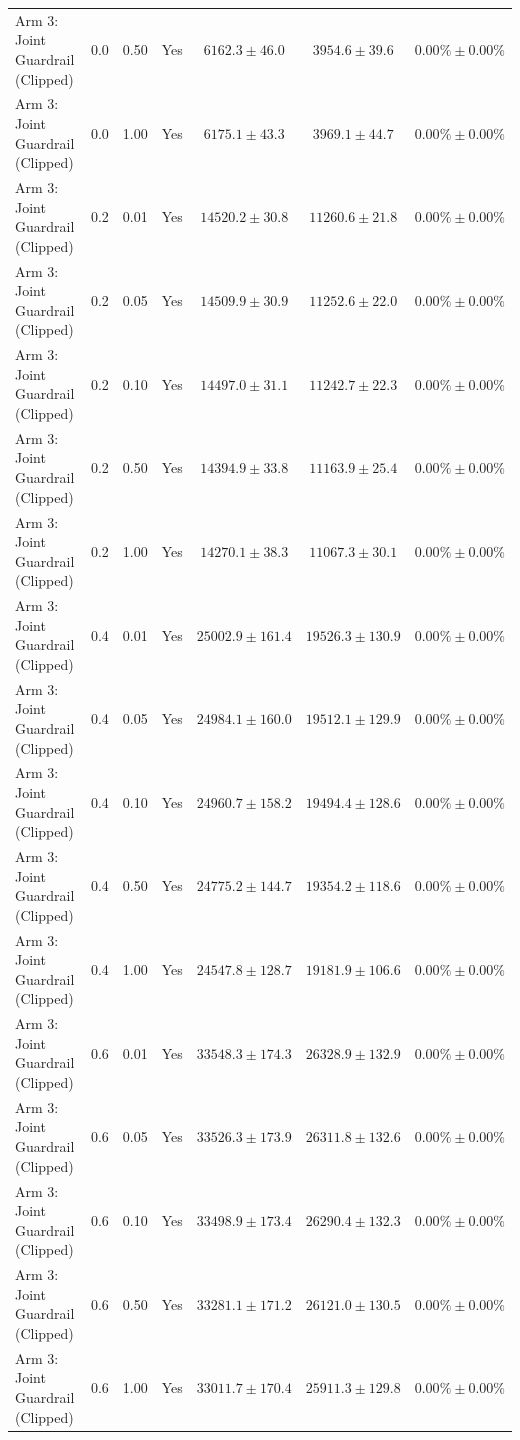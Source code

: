 \documentclass[3p,times]{elsarticle}
\begin{document}
\begin{longtable}{p{3.8cm}crrccc}
Arm 3: Joint Guardrail (Clipped) & 0.0 & 0.50 & Yes & $6162.3 \pm 46.0$ & $3954.6 \pm 39.6$ & $0.00\% \pm 0.00\%$ \\
Arm 3: Joint Guardrail (Clipped) & 0.0 & 1.00 & Yes & $6175.1 \pm 43.3$ & $3969.1 \pm 44.7$ & $0.00\% \pm 0.00\%$ \\
Arm 3: Joint Guardrail (Clipped) & 0.2 & 0.01 & Yes & $14520.2 \pm 30.8$ & $11260.6 \pm 21.8$ & $0.00\% \pm 0.00\%$ \\
Arm 3: Joint Guardrail (Clipped) & 0.2 & 0.05 & Yes & $14509.9 \pm 30.9$ & $11252.6 \pm 22.0$ & $0.00\% \pm 0.00\%$ \\
Arm 3: Joint Guardrail (Clipped) & 0.2 & 0.10 & Yes & $14497.0 \pm 31.1$ & $11242.7 \pm 22.3$ & $0.00\% \pm 0.00\%$ \\
Arm 3: Joint Guardrail (Clipped) & 0.2 & 0.50 & Yes & $14394.9 \pm 33.8$ & $11163.9 \pm 25.4$ & $0.00\% \pm 0.00\%$ \\
Arm 3: Joint Guardrail (Clipped) & 0.2 & 1.00 & Yes & $14270.1 \pm 38.3$ & $11067.3 \pm 30.1$ & $0.00\% \pm 0.00\%$ \\
Arm 3: Joint Guardrail (Clipped) & 0.4 & 0.01 & Yes & $25002.9 \pm 161.4$ & $19526.3 \pm 130.9$ & $0.00\% \pm 0.00\%$ \\
Arm 3: Joint Guardrail (Clipped) & 0.4 & 0.05 & Yes & $24984.1 \pm 160.0$ & $19512.1 \pm 129.9$ & $0.00\% \pm 0.00\%$ \\
Arm 3: Joint Guardrail (Clipped) & 0.4 & 0.10 & Yes & $24960.7 \pm 158.2$ & $19494.4 \pm 128.6$ & $0.00\% \pm 0.00\%$ \\
Arm 3: Joint Guardrail (Clipped) & 0.4 & 0.50 & Yes & $24775.2 \pm 144.7$ & $19354.2 \pm 118.6$ & $0.00\% \pm 0.00\%$ \\
Arm 3: Joint Guardrail (Clipped) & 0.4 & 1.00 & Yes & $24547.8 \pm 128.7$ & $19181.9 \pm 106.6$ & $0.00\% \pm 0.00\%$ \\
Arm 3: Joint Guardrail (Clipped) & 0.6 & 0.01 & Yes & $33548.3 \pm 174.3$ & $26328.9 \pm 132.9$ & $0.00\% \pm 0.00\%$ \\
Arm 3: Joint Guardrail (Clipped) & 0.6 & 0.05 & Yes & $33526.3 \pm 173.9$ & $26311.8 \pm 132.6$ & $0.00\% \pm 0.00\%$ \\
Arm 3: Joint Guardrail (Clipped) & 0.6 & 0.10 & Yes & $33498.9 \pm 173.4$ & $26290.4 \pm 132.3$ & $0.00\% \pm 0.00\%$ \\
Arm 3: Joint Guardrail (Clipped) & 0.6 & 0.50 & Yes & $33281.1 \pm 171.2$ & $26121.0 \pm 130.5$ & $0.00\% \pm 0.00\%$ \\
Arm 3: Joint Guardrail (Clipped) & 0.6 & 1.00 & Yes & $33011.7 \pm 170.4$ & $25911.3 \pm 129.8$ & $0.00\% \pm 0.00\%$ \\

\end{longtable}
\end{document}
